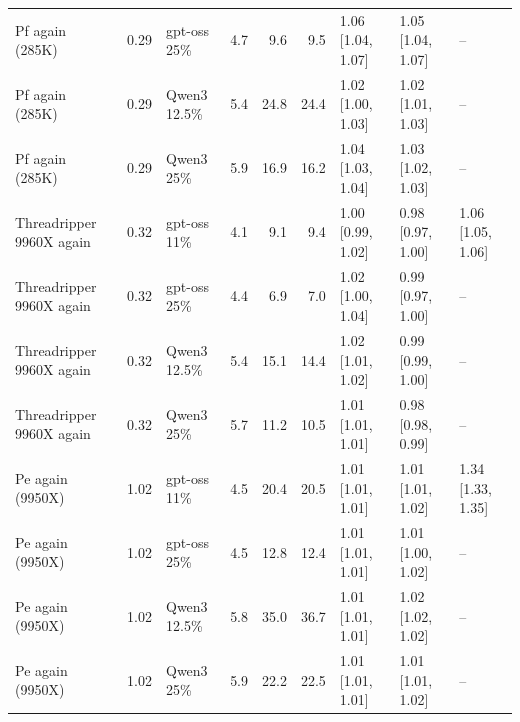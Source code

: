 \begin{table}[t]
{\begin{tabular}{@{}lrlrrrlll@{}}
Pf again (285K) & 0.29 & gpt-oss 25\% & 4.7 & 9.6 & 9.5 & 1.06 [1.04, 1.07] & 1.05 [1.04, 1.07] & -- \\
Pf again (285K) & 0.29 & Qwen3 12.5\% & 5.4 & 24.8 & 24.4 & 1.02 [1.00, 1.03] & 1.02 [1.01, 1.03] & -- \\
Pf again (285K) & 0.29 & Qwen3 25\% & 5.9 & 16.9 & 16.2 & 1.04 [1.03, 1.04] & 1.03 [1.02, 1.03] & -- \\
Threadripper 9960X again & 0.32 & gpt-oss 11\% & 4.1 & 9.1 & 9.4 & 1.00 [0.99, 1.02] & 0.98 [0.97, 1.00] & 1.06 [1.05, 1.06] \\
Threadripper 9960X again & 0.32 & gpt-oss 25\% & 4.4 & 6.9 & 7.0 & 1.02 [1.00, 1.04] & 0.99 [0.97, 1.00] & -- \\
Threadripper 9960X again & 0.32 & Qwen3 12.5\% & 5.4 & 15.1 & 14.4 & 1.02 [1.01, 1.02] & 0.99 [0.99, 1.00] & -- \\
Threadripper 9960X again & 0.32 & Qwen3 25\% & 5.7 & 11.2 & 10.5 & 1.01 [1.01, 1.01] & 0.98 [0.98, 0.99] & -- \\
Pe again (9950X) & 1.02 & gpt-oss 11\% & 4.5 & 20.4 & 20.5 & 1.01 [1.01, 1.01] & 1.01 [1.01, 1.02] & 1.34 [1.33, 1.35] \\
Pe again (9950X) & 1.02 & gpt-oss 25\% & 4.5 & 12.8 & 12.4 & 1.01 [1.01, 1.01] & 1.01 [1.00, 1.02] & -- \\
Pe again (9950X) & 1.02 & Qwen3 12.5\% & 5.8 & 35.0 & 36.7 & 1.01 [1.01, 1.01] & 1.02 [1.02, 1.02] & -- \\
Pe again (9950X) & 1.02 & Qwen3 25\% & 5.9 & 22.2 & 22.5 & 1.01 [1.01, 1.01] & 1.01 [1.01, 1.02] & -- \\
\bottomrule\end{tabular}}\end{table}

